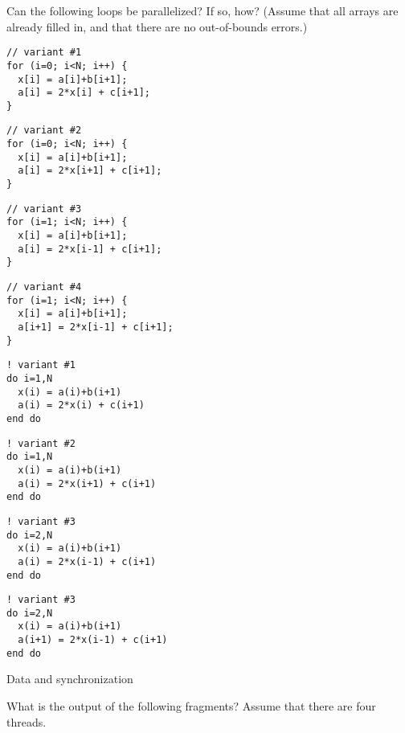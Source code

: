 Can the following loops be parallelized? If so, how?
(Assume that all arrays are already filled in,
and that there are no out-of-bounds errors.) 
\begin{multicols}{2}
\small
\begin{lstlisting}
// variant #1
for (i=0; i<N; i++) {
  x[i] = a[i]+b[i+1];
  a[i] = 2*x[i] + c[i+1];
}
\end{lstlisting}

\begin{lstlisting}
// variant #2
for (i=0; i<N; i++) {
  x[i] = a[i]+b[i+1];
  a[i] = 2*x[i+1] + c[i+1];
}
\end{lstlisting}
\columnbreak

\begin{lstlisting}
// variant #3
for (i=1; i<N; i++) {
  x[i] = a[i]+b[i+1];
  a[i] = 2*x[i-1] + c[i+1];
}
\end{lstlisting}

\begin{lstlisting}
// variant #4
for (i=1; i<N; i++) {
  x[i] = a[i]+b[i+1];
  a[i+1] = 2*x[i-1] + c[i+1];
}
\end{lstlisting}
\end{multicols}

\lstset{language=Fortran} %
\begin{multicols}{2}
\small
\begin{lstlisting}
! variant #1
do i=1,N
  x(i) = a(i)+b(i+1)
  a(i) = 2*x(i) + c(i+1)
end do
\end{lstlisting}

\begin{lstlisting}
! variant #2
do i=1,N
  x(i) = a(i)+b(i+1)
  a(i) = 2*x(i+1) + c(i+1)
end do
\end{lstlisting}
\columnbreak

\begin{lstlisting}
! variant #3
do i=2,N
  x(i) = a(i)+b(i+1)
  a(i) = 2*x(i-1) + c(i+1)
end do
\end{lstlisting}

\begin{lstlisting}
! variant #3
do i=2,N
  x(i) = a(i)+b(i+1)
  a(i+1) = 2*x(i-1) + c(i+1)
end do
\end{lstlisting}
\end{multicols}

\vfill\pagebreak

 {Data and synchronization}

 {}

What is the output of the following fragments? Assume that there are four threads.

